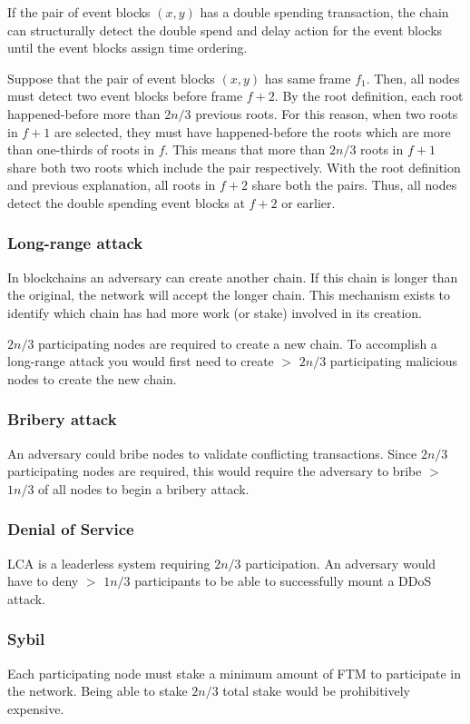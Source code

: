 \documentclass[preprint,12pt]{elsarticle}
\begin{document}
If the pair of event blocks $(x, y)$ has a double spending transaction, the chain can structurally detect the double spend and delay action for the event blocks until the event blocks assign time ordering.

Suppose that the pair of event blocks $(x, y)$ has same frame $f_1$. Then, all nodes must detect two event blocks before frame $f+2$. By the root definition, each root happened-before more than $2n/3$ previous roots. For this reason, when two roots in $f+1$ are selected, they must have happened-before the roots which are more than one-thirds of roots in $f$. This means that more than $2n/3$ roots in $f+1$ share both two roots which include the pair respectively. With the root definition and previous explanation, all roots in $f+2$ share both the pairs. Thus, all nodes detect the double spending event blocks at $f+2$ or earlier.

\subsubsection{Long-range attack}
In blockchains an adversary can create another chain. If this chain is longer than the original, the network will accept the longer chain. This mechanism exists to identify which chain has had more work (or stake) involved in its creation.

$2n/3$ participating nodes are required to create a new chain. To accomplish a long-range attack you would first need to create $>$ $2n/3$ participating malicious nodes to create the new chain.

\subsubsection{Bribery attack}
An adversary could bribe nodes to validate conflicting transactions. Since $2n/3$ participating nodes are required, this would require the adversary to bribe $>$ $1n/3$ of all nodes to begin a bribery attack.

\subsubsection{Denial of Service}
LCA is a leaderless system requiring $2n/3$ participation. An adversary would have to deny $>$ $1n/3$ participants to be able to successfully mount a DDoS attack.

\subsubsection{Sybil}
Each participating node must stake a minimum amount of FTM to participate in the network. Being able to stake $2n/3$ total stake would be prohibitively expensive.
\end{document}
